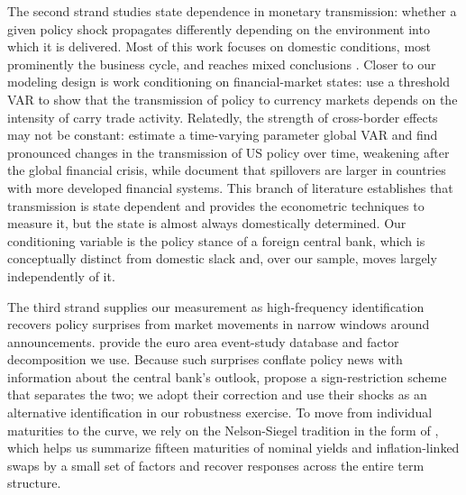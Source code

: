 The second strand studies state dependence in monetary transmission: whether a given policy shock propagates differently depending on the environment into which it is delivered. Most of this work focuses on domestic conditions, most prominently the business cycle, and reaches mixed conclusions \citep[see, e.g.,][]{tenreyro2016pushing}. Closer to our modeling design is work conditioning on financial-market states: \citet{boeck2024carry} use a threshold VAR to show that the transmission of policy to currency markets depends on the intensity of carry trade activity. Relatedly, the strength of cross-border effects may not be constant: \citet{crespo2019spillovers} estimate a time-varying parameter global VAR and find pronounced changes in the transmission of US policy over time, weakening after the global financial crisis, while \citet{bluwstein2018beggar} document that spillovers are larger in countries with more developed financial systems. This branch of literature establishes that transmission is state dependent and provides the econometric techniques to measure it, but the state is almost always domestically determined. Our conditioning variable is the policy stance of a foreign central bank, which is conceptually distinct from domestic slack and, over our sample, moves largely independently of it.

The third strand supplies our measurement as high-frequency identification recovers policy surprises from market movements in narrow windows around announcements. \citet{altavilla2019measuring} provide the euro area event-study database and factor decomposition we use. Because such surprises conflate policy news with information about the central bank's outlook, \citet{jarocinski2020deconstructing} propose a sign-restriction scheme that separates the two; we adopt their correction and use their shocks as an alternative identification in our robustness exercise. To move from individual maturities to the curve, we rely on the Nelson-Siegel tradition in the form of \citet{DIEBOLD2006337}, which helps us summarize fifteen maturities of nominal yields and inflation-linked swaps by a small set of factors and recover responses across the entire term structure.

